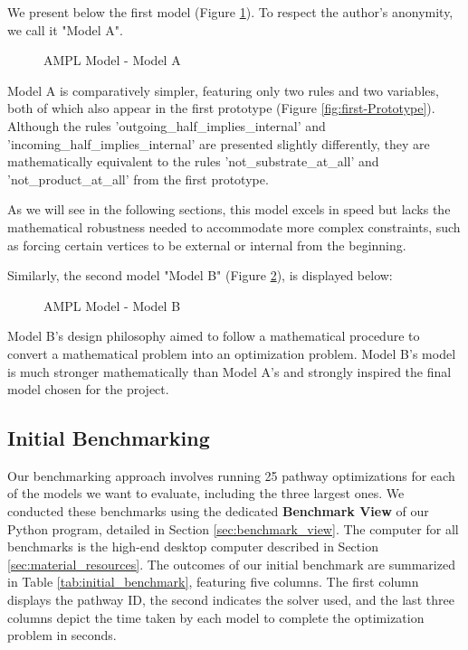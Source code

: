 We present below the first model (Figure \ref{fig:nasini}). To respect the author's anonymity, we call it "Model A".

\begin{figure}[H]
    \centering
    \caption{AMPL Model - Model A}
    \label{fig:nasini}
\end{figure}

Model A is comparatively simpler, featuring only two rules and two variables, both of which also appear in the first prototype (Figure \ref{fig:first-Prototype}). Although the rules 'outgoing\_half\_implies\_internal' and 'incoming\_half\_implies\_internal' are presented slightly differently, they are mathematically equivalent to the rules 'not\_substrate\_at\_all' and 'not\_product\_at\_all' from the first prototype.

As we will see in the following sections, this model excels in speed but lacks the mathematical robustness needed to accommodate more complex constraints, such as forcing certain vertices to be external or internal from the beginning.

Similarly, the second model "Model B" (Figure \ref{fig:valiente}), is displayed below:

\begin{figure}[H]
    \centering
    \caption{AMPL Model - Model B}
    \label{fig:valiente}
\end{figure}

Model B's design philosophy aimed to follow a mathematical procedure to convert a mathematical problem into an optimization problem. Model B's model is much stronger mathematically than Model A's and strongly inspired the final model chosen for the project.


\subsection{Initial Benchmarking}
Our benchmarking approach involves running 25 pathway optimizations for each of the models we want to evaluate, including the three largest ones. We conducted these benchmarks using the dedicated \textbf{Benchmark View} of our Python program, detailed in Section \ref{sec:benchmark_view}. The computer for all benchmarks is the high-end desktop computer described in Section \ref{sec:material_resources}. The outcomes of our initial benchmark are summarized in Table \ref{tab:initial_benchmark}, featuring five columns. The first column displays the pathway ID, the second indicates the solver used, and the last three columns depict the time taken by each model to complete the optimization problem in seconds.

